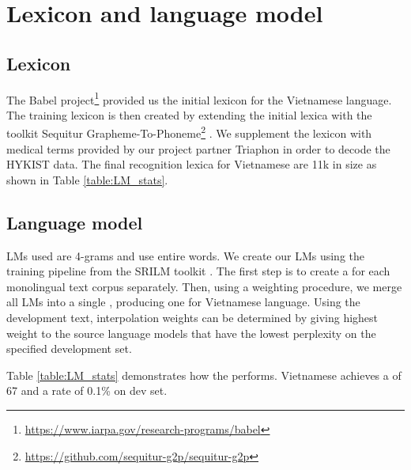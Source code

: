 \section{Lexicon and language model}



\subsection{Lexicon}

The Babel project\footnote{\href{https://www.iarpa.gov/research-programs/babel}{https://www.iarpa.gov/research-programs/babel}} provided us the initial lexicon for the Vietnamese language.
The training lexicon is then created by extending the initial lexica with the toolkit Sequitur Grapheme-To-Phoneme\footnote{\href{https://github.com/sequitur-g2p/sequitur-g2p}{https://github.com/sequitur-g2p/sequitur-g2p}} \cite{bisani2008g2p}.
We supplement the lexicon with medical terms provided by our project partner Triaphon in order to decode the HYKIST data.
The final recognition lexica for Vietnamese are 11k in size as shown in Table \ref{table:LM_stats}.


\subsection{Language model}

\glspl{LM} used are 4-grams and use entire words. 
We create our \glspl{LM} using the training pipeline from the SRILM toolkit \cite{stolcke2002srilm}.
The first step is to create a  for each monolingual text corpus separately. 
Then, using a weighting procedure, we merge all \glspl{LM}  into a single , producing one  for Vietnamese language.
Using the development text, interpolation weights can be determined by giving highest weight to the source language models that have the lowest perplexity on the specified development set.

Table \ref{table:LM_stats} demonstrates how the  performs. 
Vietnamese  achieves a  of 67 and a  rate of 0.1\% on dev set.
